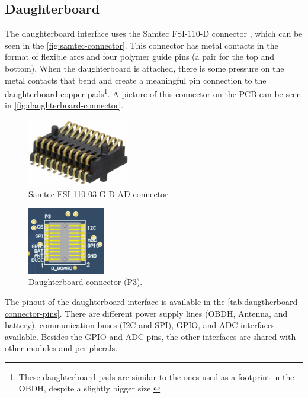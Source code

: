 \subsection{Daughterboard} \label{sec:daughterboard-interface}

The daughterboard interface uses the Samtec FSI-110-D connector \cite{fsi-conn}, which can be seen in the \autoref{fig:samtec-connector}. This connector has metal contacts in the format of flexible arcs and four polymer guide pins (a pair for the top and bottom). When the daughterboard is attached, there is some pressure on the metal contacts that bend and create a meaningful pin connection to the daughterboard copper pads\footnote{These daughterboard pads are similar to the ones used as a footprint in the OBDH, despite a slightly bigger size.}. A picture of this connector on the PCB can be seen in \autoref{fig:daughterboard-connector}.

\begin{figure}[!ht]
    \begin{center}
        \includegraphics[width=0.4\textwidth]{figures/samtec_fsi-110-03-g-d-ad.jpeg}
        \caption{Samtec FSI-110-03-G-D-AD connector.}
        \label{fig:samtec-connector}
    \end{center}
\end{figure}

\begin{figure}[!ht]
    \begin{center}
        \includegraphics[width=0.3\textwidth]{figures/p3-connector.png}
        \caption{Daughterboard connector (P3).}
        \label{fig:daughterboard-connector}
    \end{center}
\end{figure}

The pinout of the daughterboard interface is available in the \autoref{tab:daugtherboard-connector-pins}. There are different power supply lines (OBDH, Antenna, and battery), communication buses (I2C and SPI), GPIO, and ADC interfaces available. Besides the GPIO and ADC pins, the other interfaces are shared with other modules and peripherals.

